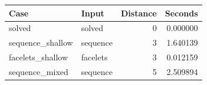 {\small
\begin{tabular}{llrr}
\hline
Case & Input & Distance & Seconds \\
\hline
solved & solved & 0 & 0.000000 \\
sequence\_shallow & sequence & 3 & 1.640139 \\
facelets\_shallow & facelets & 3 & 0.012159 \\
sequence\_mixed & sequence & 5 & 2.509894 \\
\hline
\end{tabular}
}

